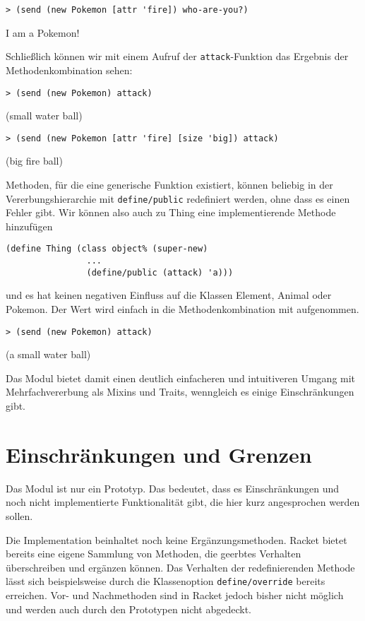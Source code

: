 \begin{lstlisting}
> (send (new Pokemon [attr 'fire]) who-are-you?)
\end{lstlisting}
{\routput {\qq}I am a Pokemon!\qq}

Schließlich können wir mit einem Aufruf der \texttt{attack}-Funktion das Ergebnis der Methodenkombination sehen:

\begin{lstlisting}
> (send (new Pokemon) attack)
\end{lstlisting}
{\rsymbol (small water ball)}

\begin{lstlisting}
> (send (new Pokemon [attr 'fire] [size 'big]) attack)
\end{lstlisting}
{\rsymbol (big fire ball)}

Methoden, für die eine generische Funktion existiert, können beliebig in der Vererbungshierarchie mit \texttt{define/public} redefiniert werden, ohne dass es einen Fehler gibt. Wir können also auch zu Thing eine implementierende Methode hinzufügen

\begin{lstlisting}
(define Thing (class object% (super-new)
                ...
                (define/public (attack) 'a)))
\end{lstlisting}

und es hat keinen negativen Einfluss auf die Klassen Element, Animal oder Pokemon. Der Wert wird einfach in die Methodenkombination mit aufgenommen.

\begin{lstlisting}
> (send (new Pokemon) attack)
\end{lstlisting}
{\rsymbol (a small water ball)}

Das Modul bietet damit einen deutlich einfacheren und intuitiveren Umgang mit Mehrfachvererbung als Mixins und Traits, wenngleich es einige Einschränkungen gibt.

\section{Einschränkungen und Grenzen}
Das Modul ist nur ein Prototyp. Das bedeutet, dass es  Einschränkungen und noch nicht implementierte Funktionalität gibt, die hier kurz angesprochen werden sollen.

Die Implementation beinhaltet noch keine Ergänzungsmethoden. Racket bietet bereits eine eigene Sammlung von Methoden, die geerbtes Verhalten überschreiben und ergänzen können. Das Verhalten der redefinierenden Methode lässt sich beispielsweise durch die Klassenoption \texttt{define/override} bereits erreichen. Vor- und Nachmethoden sind in Racket jedoch bisher nicht möglich und werden auch durch den Prototypen nicht abgedeckt.

